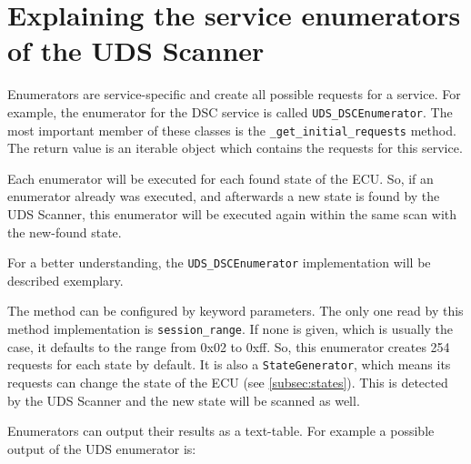 \section{Explaining the service enumerators of the UDS Scanner}


Enumerators are service-specific and create all possible requests for a service.
For example, the enumerator for the DSC service is called \texttt{UDS_DSCEnumerator}. The most important member of these classes is the \texttt{_get_initial_requests} method. The return value is an iterable object which contains the requests for this service.

Each enumerator will be executed for each found state of the ECU. So, if an enumerator already was executed, and afterwards a new state is found by the UDS Scanner, this enumerator will be executed again within the same scan with the new-found state.

For a better understanding, the \texttt{UDS_DSCEnumerator} implementation will be described exemplary.


The method can be configured by keyword parameters. The only one read by this method implementation is \texttt{session_range}. If none is given, which is usually the case, it defaults to the range from 0x02 to 0xff. So, this enumerator creates 254 requests for each state by default. It is also a \texttt{StateGenerator}, which means its requests can change the state of the ECU (see \autoref{subsec:states}). This is detected by the UDS Scanner and the new state will be scanned as well.

Enumerators can output their results as a text-table. For example a possible output of the UDS enumerator is:

